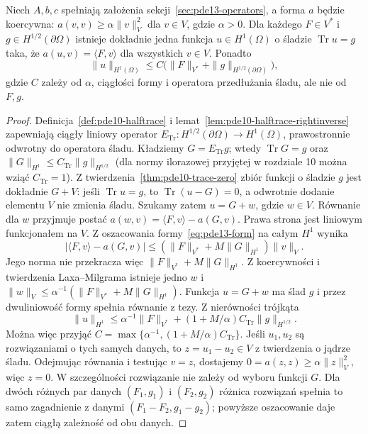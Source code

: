 \begin{twierdzenie}
\label{thm:pde13-nonhom}
Niech $A,b,c$ spełniają założenia sekcji~\ref{sec:pde13-operators},
a forma $a$ będzie koercywna: $a(v,v)\geq\alpha\|v\|_V^2$
dla $v\in V$, gdzie $\alpha>0$.
Dla każdego $F\in V^*$ i $g\in H^{1/2}(\partial\Omega)$
istnieje dokładnie jedna funkcja $u\in H^1(\Omega)$ o śladzie
$\operatorname{Tr}u=g$ taka, że
$a(u,v)=\langle F,v\rangle$ dla wszystkich $v\in V$.
Ponadto
\[
 \|u\|_{H^1(\Omega)}\leq C\big(\|F\|_{V^*}
 +\|g\|_{H^{1/2}(\partial\Omega)}\big),
\]
gdzie $C$ zależy od $\alpha$, ciągłości formy i operatora
przedłużania śladu, ale nie od $F,g$.
\end{twierdzenie}
\begin{proof}
Definicja~\ref{def:pde10-halftrace} i lemat~\ref{lem:pde10-halftrace-rightinverse}
zapewniają ciągły liniowy operator
$E_{\operatorname{Tr}}:H^{1/2}(\partial\Omega)\to H^1(\Omega)$,
prawostronnie odwrotny do operatora śladu.
Kładziemy $G=E_{\operatorname{Tr}}g$; wtedy $\operatorname{Tr}G=g$
oraz $\|G\|_{H^1}\leq C_{\operatorname{Tr}}\|g\|_{H^{1/2}}$
(dla normy ilorazowej przyjętej w rozdziale 10 można wziąć
$C_{\operatorname{Tr}}=1$).
Z twierdzenia~\ref{thm:pde10-trace-zero} zbiór funkcji
o śladzie $g$ jest dokładnie $G+V$: jeśli $\operatorname{Tr}u=g$,
to $\operatorname{Tr}(u-G)=0$, a odwrotnie dodanie elementu $V$
nie zmienia śladu.
Szukamy zatem $u=G+w$, gdzie $w\in V$.
Równanie dla $w$ przyjmuje postać
$a(w,v)=\langle F,v\rangle-a(G,v)$.
Prawa strona jest liniowym funkcjonałem na $V$.
Z oszacowania formy~\eqref{eq:pde13-form} na całym $H^1$
wynika
\[
 |\langle F,v\rangle-a(G,v)|
 \le(\|F\|_{V^*}+M\|G\|_{H^1})\|v\|_V.
\]
Jego norma nie przekracza więc $\|F\|_{V^*}+M\|G\|_{H^1}$.
Z koercywności i twierdzenia Laxa--Milgrama istnieje
jedno $w$ i
$\|w\|_V\leq\alpha^{-1}
(\|F\|_{V^*}+M\|G\|_{H^1})$.
Funkcja $u=G+w$ ma ślad $g$ i przez dwuliniowość formy
spełnia równanie z tezy. Z nierówności trójkąta
\[
 \|u\|_{H^1}
 \leq \alpha^{-1}\|F\|_{V^*}
 +(1+M/\alpha)C_{\operatorname{Tr}}\|g\|_{H^{1/2}}.
\]
Można więc przyjąć
$C=\max\{\alpha^{-1},(1+M/\alpha)C_{\operatorname{Tr}}\}$.
Jeśli $u_1,u_2$ są rozwiązaniami o tych samych danych, to
$z=u_1-u_2\in V$ z twierdzenia o jądrze śladu.
Odejmując równania i testując $v=z$, dostajemy
$0=a(z,z)\geq\alpha\|z\|_V^2$, więc $z=0$.
W szczególności rozwiązanie nie zależy od wyboru funkcji $G$.
Dla dwóch różnych par danych $(F_1,g_1)$ i $(F_2,g_2)$
różnica rozwiązań spełnia to samo zagadnienie z danymi
$(F_1-F_2,g_1-g_2)$; powyższe oszacowanie daje zatem
ciągłą zależność od obu danych.
\end{proof}

